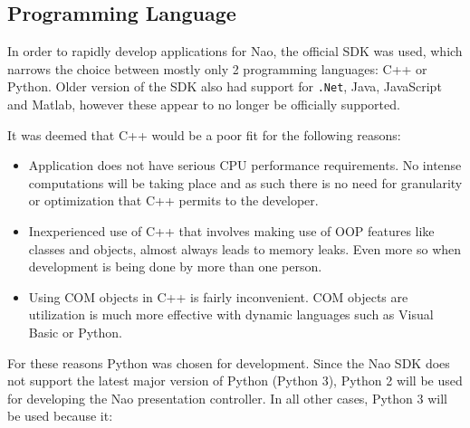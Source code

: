 \documentclass[12pt, fleqn, a4paper]{article}
\begin{document}
\subsection{Programming Language}
In order to rapidly develop applications for Nao, the official SDK was used, which narrows the choice between mostly only 2 programming languages: C++ or Python. Older version of the SDK also had support for \verb|.Net|, Java, JavaScript and Matlab, however these appear to no longer be officially supported.\par
It was deemed that C++ would be a poor fit for the following reasons:
\begin{itemize}
	\item Application does not have serious CPU performance requirements. No intense computations will be taking place and as such there is no need for granularity or optimization that C++ permits to the developer.
	\item Inexperienced use of C++ that involves making use of OOP features like classes and objects, almost always leads to memory leaks. Even more so when development is being done by more than one person.
	\item Using COM objects in C++ is fairly inconvenient. COM objects are utilization is much more effective with dynamic languages such as Visual Basic or Python.
\end{itemize}
For these reasons Python was chosen for development. Since the Nao SDK does not support the latest major version of Python (Python 3), Python 2 will be used for developing the Nao presentation controller. 
In all other cases, Python 3 will be used because it:
\end{document}
